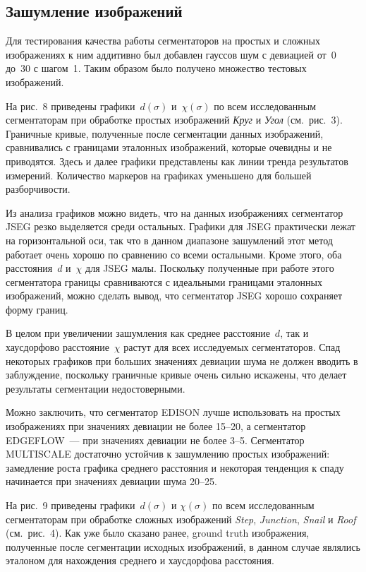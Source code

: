 \begin{multicols}{2}
  \subsection{Зашумление изображений} %
  
  Для тестирования качества работы сегментаторов на простых и сложных 
изображениях к ним аддитивно был добавлен гауссов шум с девиацией от~0 
до~30 с шагом~1. Таким образом было получено множество тестовых 
изображений.
  
  На рис.~8 приведены графики~$d(\sigma)$ и~$\chi(\sigma)$ по всем 
исследованным сегментаторам при обработке простых изображений 
\textit{Круг} и \textit{Угол} (см.\ рис.~3). Граничные кривые, полученные после 
сегментации данных изображений, сравнивались с границами эталонных 
изображений, которые очевидны и не приводятся. Здесь и далее графики 
представлены как линии тренда результатов измерений. Количество маркеров 
на графиках уменьшено для большей разборчивости.
  
  Из анализа графиков можно видеть, что на данных изображениях 
сегментатор {JSEG} резко выделяется среди остальных. Графики для 
{JSEG} практически лежат на горизонтальной оси, так что в данном 
диапазоне зашумлений этот метод работает очень хорошо по сравнению со 
всеми остальными. Кроме этого, оба расстояния~$d$ и~$\chi$ для {JSEG} 
малы. Поскольку полученные при работе этого сегментатора границы 
сравниваются с идеальными границами эталонных изображений, можно 
сделать вывод, что сегментатор {JSEG} хорошо сохраняет форму границ.
  
  В целом при увеличении зашумления как среднее расстояние~$d$, так и 
хаусдорфово расстояние~$\chi$ растут для всех исследуемых сегментаторов. 
Спад некоторых графиков при больших значениях девиации шума не должен 
вводить в заблуждение, поскольку граничные кривые очень сильно искажены, 
что делает результаты сегментации недостоверными. 

Можно заключить, что 
сегментатор {EDISON} лучше использовать на простых изображениях при 
значениях девиации не более 15--20, а сегментатор {EDGEFLOW}~--- при 
значениях девиации не более 3--5. Сегментатор {MULTISCALE} 
достаточно устойчив к зашумлению простых изображений: замедление роста 
графика среднего расстояния и некоторая тенденция к спаду начинается при 
значениях девиации шума 20--25.

  
  На рис.~9 приведены графики~$d(\sigma)$ и $\chi(\sigma)$ по всем 
исследованным сегментаторам при обработке сложных изображений 
\textit{Step}, \textit{Junction}, \textit{Snail} и \textit{Roof} (см.\ рис.~4). Как уже 
было сказано ранее, ground truth изображения, полученные после 
сегментации исходных изображений, в данном случае являлись эталоном для 
нахождения среднего и хаусдорфова расстояния.


\end{multicols}
